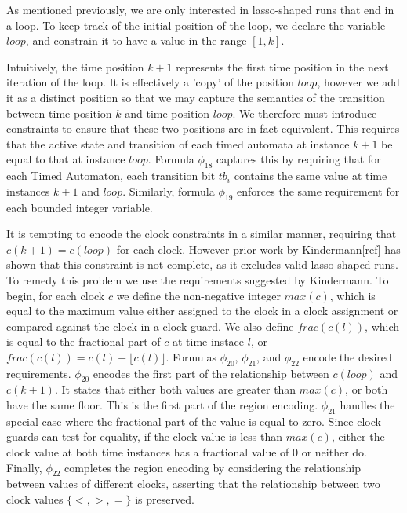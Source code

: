 \documentclass[a4paper,12pt]{article}
\begin{document}
As mentioned previously, we are only interested in lasso-shaped runs that end in
a loop. To keep track of the initial position of the loop, we declare the
variable \(loop\), and constrain it to have a value in the range \([1,k]\).

Intuitively, the time position \(k+1\) represents the first time position in the
next iteration of the loop. It is effectively a 'copy' of the position
\(loop\), however we add it as a distinct position so that we may capture
the semantics of the transition between time position \(k\) and time position
\(loop\). We therefore must introduce constraints to ensure that these two
positions are in fact equivalent. This requires that the active state and
transition of each timed automata at instance \(k+1\) be equal to that at
instance \(loop\). Formula \(\phi_{18}\) captures this by requiring that
for each Timed Automaton, each transition bit \(tb_i\) contains the same value
at time instances \(k+1\) and \(loop\). Similarly, formula \(\phi_{19}\)
enforces the same requirement for each bounded integer variable.

It is tempting to encode the clock constraints in a similar manner, requiring
that \(c(k+1) = c(loop)\) for each clock. However prior work by Kindermann[ref]
has shown that this constraint is not complete, as it excludes valid
lasso-shaped runs. To remedy this problem we use the requirements suggested by
Kindermann. To begin, for each clock \(c\) we define the non-negative integer
\(max(c)\), which is equal to the maximum value either assigned to the clock in
a clock assignment or compared against the clock in a clock guard. We also
define \(frac(c(l))\), which is equal to the fractional part of \(c\) at time
instace \(l\), or \(frac(c(l)) = c(l) - \lfloor c(l) \rfloor\). Formulas
\(\phi_{20}\), \(\phi_{21}\), and \(\phi_{22}\) encode the desired requirements.
\(\phi_{20}\) encodes the first part of the relationship between \(c(loop)\) and
\(c(k+1)\). It states that either both values are greater than \(max(c)\), or
both have the same floor. This is the first part of the region encoding.
\(\phi_{21}\) handles the special case where the fractional part of the value is
equal to zero. Since clock guards can test for equality, if the clock value is
less than \(max(c)\), either the clock value at both time instances has a
fractional value of 0 or neither do. Finally, \(\phi_{22}\) completes the region
encoding by considering the relationship between values of different clocks,
asserting that the relationship between two clock values \(\{<,>,=\}\) is
preserved.
\end{document}

